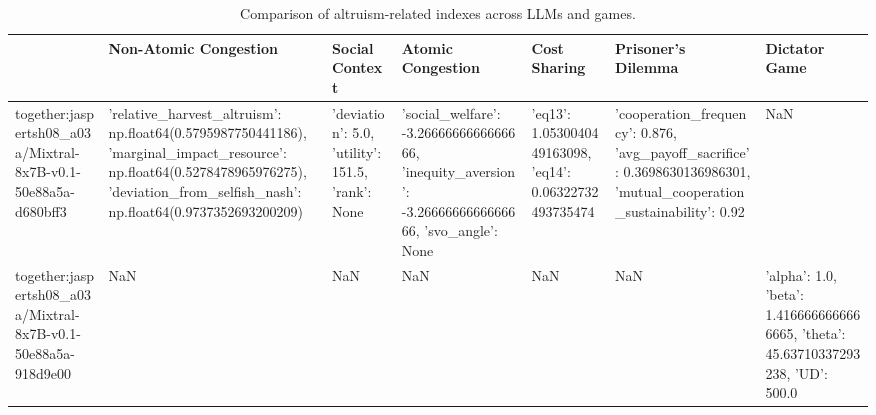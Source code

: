 \begin{table}
\caption{Comparison of altruism-related indexes across LLMs and games.}
\label{tab:altruism_indexes}
\begin{tabular}{lllllll}
\toprule
 & Non-Atomic Congestion & Social Context & Atomic Congestion & Cost Sharing & Prisoner's Dilemma & Dictator Game \\
\midrule
together:jaspertsh08_a03a/Mixtral-8x7B-v0.1-50e88a5a-d680bff3 & {'relative_harvest_altruism': np.float64(0.5795987750441186), 'marginal_impact_resource': np.float64(0.5278478965976275), 'deviation_from_selfish_nash': np.float64(0.9737352693200209)} & {'deviation': 5.0, 'utility': 151.5, 'rank': None} & {'social_welfare': -3.2666666666666666, 'inequity_aversion': -3.2666666666666666, 'svo_angle': None} & {'eq13': 1.0530040449163098, 'eq14': 0.06322732493735474} & {'cooperation_frequency': 0.876, 'avg_payoff_sacrifice': 0.3698630136986301, 'mutual_cooperation_sustainability': 0.92} & NaN \\
together:jaspertsh08_a03a/Mixtral-8x7B-v0.1-50e88a5a-918d9e00 & NaN & NaN & NaN & NaN & NaN & {'alpha': 1.0, 'beta': 1.4166666666666665, 'theta': 45.63710337293238, 'UD': 500.0} \\
\bottomrule
\end{tabular}
\end{table}

